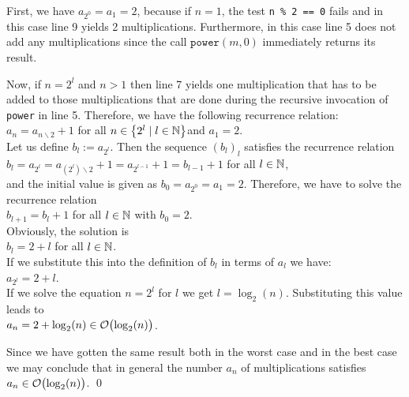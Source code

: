 First, we have $a_{2^0} = a_1 = 2$, because if $n = 1$, the test \texttt{n \% 2 == 0} fails and in
this case line 9 yields 2 multiplications.  Furthermore, in this case
line 5 does not add any multiplications since the call $\mathtt{power}(m,0)$ immediately returns its
result.

Now, if $n = 2^l$ and $n > 1$ then line 7 yields one multiplication that 
has to be added to those multiplications that are done during the recursive invocation of
\texttt{power} in line 5.  Therefore, we have the following recurrence relation:
 \\[0.2cm]
\hspace*{1.3cm} $a_n = a_{n \backslash 2} + 1$ \qquad for all $n \in \left\{2^l \mid l \in {\mathbb N}\right\}$\quad and
$a_1 = 2$. 
\\[0.2cm]
Let us define $b_l := a_{2^l}$.  Then the sequence $(b_l)_l$ satisfies the recurrence relation
 \\[0.2cm]
\hspace*{1.3cm} 
$b_l = a_{2^l} = a_{(2^l) \backslash 2} + 1 = a_{2^{l-1}} + 1 = b_{l-1} + 1$ \qquad for all $l\in{\mathbb N}$, \\[0.2cm]
and the initial value is given as $b_0 = a_{2^0} = a_1 = 2$.
Therefore, we have to solve the recurrence relation 
\\[0.2cm]
\hspace*{1.3cm}
 $b_{l+1} = b_l + 1$ \qquad for all $l \in {\mathbb N}$ \quad with $b_0 = 2$.\\[0.2cm]
Obviously, the solution is \\[0.2cm]
\hspace*{1.3cm} $b_l = 2 + l$ \qquad for all $l\in{\mathbb N}$.
\\[0.2cm]
If we substitute this into the definition of $b_l$ in terms of $a_l$ we have: \\[0.2cm]
\hspace*{1.3cm}
$a_{2^l} = 2 + l$. 
\\[0.2cm]
If we solve the equation $n = 2^l$ for  $l$ we get $l =
\log_2(n)$. Substituting this value leads to
\\[0.2cm]
\hspace*{1.3cm}
 $a_n = 2 + \log_2(n) \in \mathcal{O}\bigl(\log_2(n)\bigr)$.
\vspace*{0.3cm}

Since we have gotten the same result both in the worst case and in the best case we may conclude
that in general the number $a_n$ of multiplications satisfies 
\\[0.2cm]
\hspace*{1.3cm} 
$a_n \in \mathcal{O}\bigl(\log_2(n)\bigr)$. \qed

